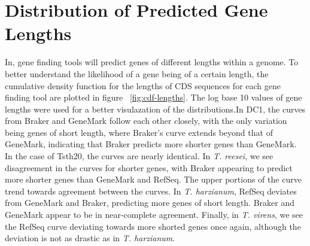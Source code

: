 \section{Distribution of Predicted Gene Lengths}

In, gene finding tools will predict genes of different lengths within
a genome. To better understand the likelihood of a gene being of a
certain length, the cumulative density function for the lengths of CDS
sequences for each gene finding tool are plotted in figure
~\ref{fig:cdf-lengths}. The log base 10 values of gene lengths were
used for a better visulazation of the distributions.In DC1, the curves
from Braker and GeneMark follow each other closely, with the only
variation being genes of short length, where Braker's curve extends
beyond that of GeneMark, indicating that Braker predicts more shorter
genes than GeneMark. In the case of Tsth20, the curves are nearly
identical. In \textit{T. reesei}, we see disagreement in the curves
for shorter genes, with Braker appearing to predict more shorter genes
than GeneMark and RefSeq. The upper portions of the curve trend
towards agreement between the curves. In \textit{T. harzianum}, RefSeq
deviates from GeneMark and Braker, predicting more genes of short
length. Braker and GeneMark appear to be in near-complete
agreement. Finally, in \textit{T. virens}, we see the RefSeq curve
deviating towards more shorted genes once again, although the
deviation is not as drastic as in \textit{T. harzianum}.


